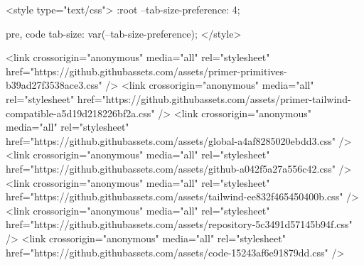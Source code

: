   <style type="text/css">
    :root {
      --tab-size-preference: 4;
    }

    pre, code {
      tab-size: var(--tab-size-preference);
    }
  </style>

    <link crossorigin="anonymous" media="all" rel="stylesheet" href="https://github.githubassets.com/assets/primer-primitives-b39ad27f3538ace3.css" />
    <link crossorigin="anonymous" media="all" rel="stylesheet" href="https://github.githubassets.com/assets/primer-tailwind-compatible-a5d19d218226bf2a.css" />
    <link crossorigin="anonymous" media="all" rel="stylesheet" href="https://github.githubassets.com/assets/global-a4af8285020ebdd3.css" />
    <link crossorigin="anonymous" media="all" rel="stylesheet" href="https://github.githubassets.com/assets/github-a042f5a27a556c42.css" />
    <link crossorigin="anonymous" media="all" rel="stylesheet" href="https://github.githubassets.com/assets/tailwind-ee832f465450400b.css" />
  <link crossorigin="anonymous" media="all" rel="stylesheet" href="https://github.githubassets.com/assets/repository-5c3491d57145b94f.css" />
<link crossorigin="anonymous" media="all" rel="stylesheet" href="https://github.githubassets.com/assets/code-15243af6e91879dd.css" />

  

